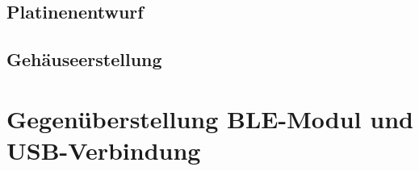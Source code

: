 

\subsection{Platinenentwurf}

\subsection{Gehäuseerstellung}

\section{Gegenüberstellung BLE-Modul und USB-Verbindung}
